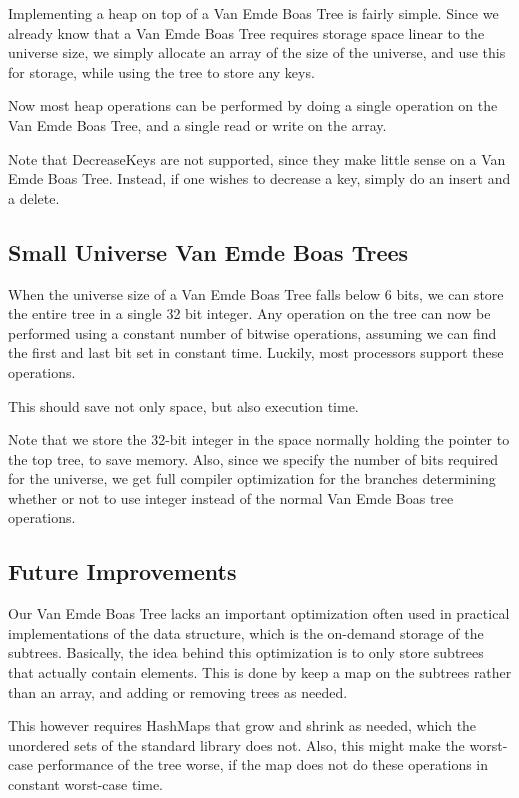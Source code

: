 Implementing a heap on top of a Van Emde Boas Tree is fairly simple. Since we already know that a Van Emde Boas Tree requires storage space linear to the universe size, we simply allocate an array of the size of the universe, and use this for storage, while using the tree to store any keys.

Now most heap operations can be performed by doing a single operation on the Van Emde Boas Tree, and a single read or write on the array.

Note that DecreaseKeys are not supported, since they make little sense on a Van Emde Boas Tree. Instead, if one wishes to decrease a key, simply do an insert and a delete.

\subsection{Small Universe Van Emde Boas Trees}

When the universe size of a Van Emde Boas Tree falls below 6 bits, we can store the entire tree in a single 32 bit integer. Any operation on the tree can now be performed using a constant number of bitwise operations, assuming we can find the first and last bit set in constant time. Luckily, most processors support these operations.

This should save not only space, but also execution time.

Note that we store the 32-bit integer in the space normally holding the pointer to the top tree, to save memory. Also, since we specify the number of bits required for the universe, we get full compiler optimization for the branches determining whether or not to use integer instead of the normal Van Emde Boas tree operations.

\subsection{Future Improvements}

Our Van Emde Boas Tree lacks an important optimization often used in practical implementations of the data structure, which is the on-demand storage of the subtrees. Basically, the idea behind this optimization is to only store subtrees that actually contain elements. This is done by keep a map on the subtrees rather than an array, and adding or removing trees as needed.

This however requires HashMaps that grow and shrink as needed, which the unordered sets of the standard library does not. Also, this might make the worst-case performance of the tree worse, if the map does not do these operations in constant worst-case time.